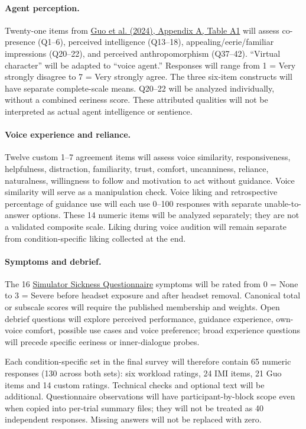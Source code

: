 \paragraph{Agent perception.} Twenty-one items from \href{https://doi.org/10.1145/3651288}{Guo et al. (2024), Appendix A, Table A1} will assess co-presence (Q1--6), perceived intelligence (Q13--18), appealing/eerie/familiar impressions (Q20--22), and perceived anthropomorphism (Q37--42). ``Virtual character'' will be adapted to ``voice agent.'' Responses will range from 1 = Very strongly disagree to 7 = Very strongly agree. The three six-item constructs will have separate complete-scale means. Q20--22 will be analyzed individually, without a combined eeriness score. These attributed qualities will not be interpreted as actual agent intelligence or sentience.

\paragraph{Voice experience and reliance.} Twelve custom 1--7 agreement items will assess voice similarity, responsiveness, helpfulness, distraction, familiarity, trust, comfort, uncanniness, reliance, naturalness, willingness to follow and motivation to act without guidance. Voice similarity will serve as a manipulation check. Voice liking and retrospective percentage of guidance use will each use 0--100 responses with separate unable-to-answer options. These 14 numeric items will be analyzed separately; they are not a validated composite scale. Liking during voice audition will remain separate from condition-specific liking collected at the end.

\paragraph{Symptoms and debrief.} The 16 \href{https://doi.org/10.1207/s15327108ijap0303_3}{Simulator Sickness Questionnaire} symptoms will be rated from 0 = None to 3 = Severe before headset exposure and after headset removal. Canonical total or subscale scores will require the published membership and weights. Open debrief questions will explore perceived performance, guidance experience, own-voice comfort, possible use cases and voice preference; broad experience questions will precede specific eeriness or inner-dialogue probes.

Each condition-specific set in the final survey will therefore contain 65 numeric responses (130 across both sets): six workload ratings, 24 IMI items, 21 Guo items and 14 custom ratings. Technical checks and optional text will be additional. Questionnaire observations will have participant-by-block scope even when copied into per-trial summary files; they will not be treated as 40 independent responses. Missing answers will not be replaced with zero.


